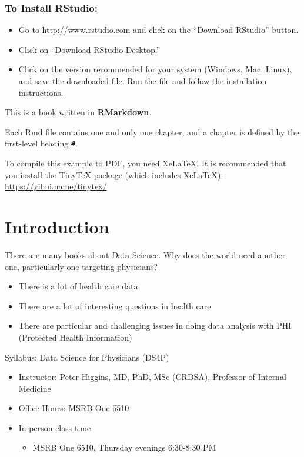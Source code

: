 \documentclass[]{book}
\providecommand{\tightlist}{%
  \setlength{\itemsep}{0pt}\setlength{\parskip}{0pt}}
\theoremstyle{definition}
\theoremstyle{definition}
\theoremstyle{definition}
\theoremstyle{remark}
\begin{document}
\hypertarget{to-install-rstudio}{%
\subsection{To Install RStudio:}\label{to-install-rstudio}}

\begin{itemize}
\tightlist
\item
  Go to \url{http://www.rstudio.com} and click on the ``Download
  RStudio'' button.
\item
  Click on ``Download RStudio Desktop.''
\item
  Click on the version recommended for your system (Windows, Mac,
  Linux), and save the downloaded file. Run the file and follow the
  installation instructions.\\
   
\end{itemize}

This is a book written in \textbf{RMarkdown}.

Each Rmd file contains one and only one chapter, and a chapter is
defined by the first-level heading \texttt{\#}.

To compile this example to PDF, you need XeLaTeX. It is recommended that
you install the TinyTeX package (which includes XeLaTeX):
\url{https://yihui.name/tinytex/}.

\hypertarget{intro}{%
\chapter{Introduction}\label{intro}}

There are many books about Data Science. Why does the world need another
one, particularly one targeting physicians?

\begin{itemize}
\tightlist
\item
  There is a lot of health care data
\item
  There are a lot of interesting questions in health care
\item
  There are particular and challenging issues in doing data analysis
  with PHI (Protected Health Information)
\end{itemize}

Syllabus: Data Science for Physicians (DS4P)

\begin{itemize}
\tightlist
\item
  Instructor: Peter Higgins, MD, PhD, MSc (CRDSA), Professor of Internal
  Medicine
\item
  Office Hours: MSRB One 6510
\item
  In-person class time

  \begin{itemize}
  \tightlist
  \item
    MSRB One 6510, Thursday evenings 6:30-8:30 PM 
  \end{itemize}
\end{itemize}
\end{document}
